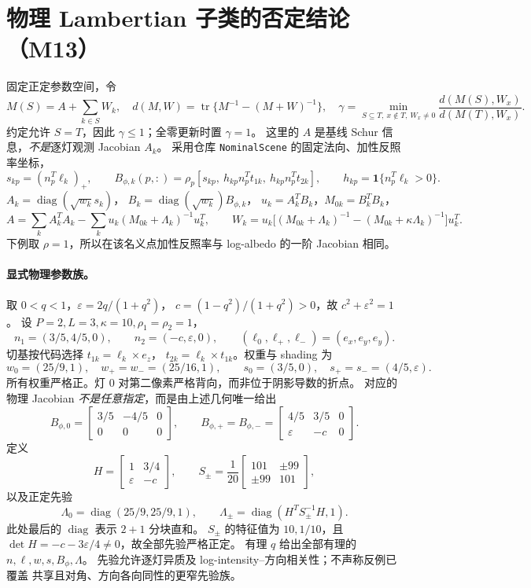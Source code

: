\section{物理 Lambertian 子类的否定结论（M13）}
\label{sec:physical-gamma-extension}

固定正定参数空间，令
\[
 M(S)=A+\sum_{k\in S}W_k,\quad
 d(M,W)=\operatorname{tr}\{M^{-1}-(M+W)^{-1}\},\quad
 \gamma=\min_{S\subseteq T,\ x\notin T,\ W_x\ne0}
 \frac{d(M(S),W_x)}{d(M(T),W_x)}.
\]
约定允许 $S=T$，因此 $\gamma\le1$；全零更新时置 $\gamma=1$。
这里的 $A$ 是基线 Schur 信息，\emph{不是}逐灯观测 Jacobian $A_k$。
采用仓库 \texttt{NominalScene} 的固定法向、加性反照率坐标，
\[
 s_{kp}=(n_p^T\ell_k)_+,
 \qquad B_{\phi,k}(p,:)=\rho_p[s_{kp},\ h_{kp}n_p^Tt_{1k},\ h_{kp}n_p^Tt_{2k}],
 \qquad h_{kp}=\mathbf1\{n_p^T\ell_k>0\}.
\]
$A_k=\operatorname{diag}(\sqrt{w_k}s_k)$，
$B_k=\operatorname{diag}(\sqrt{w_k})B_{\phi,k}$，
$u_k=A_k^TB_k$，$M_{0k}=B_k^TB_k$，
\[
 A=\sum_k A_k^TA_k-\sum_k u_k(M_{0k}+\Lambda_k)^{-1}u_k^T,
 \qquad
 W_k=u_k\big[(M_{0k}+\Lambda_k)^{-1}
 -(M_{0k}+\kappa\Lambda_k)^{-1}\big]u_k^T.
\]
下例取 $\rho=1$，所以在该名义点加性反照率与 log-albedo 的一阶 Jacobian 相同。

\paragraph{显式物理参数族。}
取 $0<q<1$，$\varepsilon=2q/(1+q^2)$，
$c=(1-q^2)/(1+q^2)>0$，故 $c^2+\varepsilon^2=1$。
设 $P=2,L=3,\kappa=10,\rho_1=\rho_2=1$，
\[
 n_1=(3/5,4/5,0),\qquad n_2=(-c,\varepsilon,0),
 \qquad (\ell_0,\ell_+,\ell_-)=(e_x,e_y,e_y).
\]
切基按代码选择 $t_{1k}=\ell_k\times e_z$，
$t_{2k}=\ell_k\times t_{1k}$。权重与 shading 为
\[
 w_0=(25/9,1),\quad w_+=w_-=(25/16,1),\qquad
 s_0=(3/5,0),\quad s_+=s_-=(4/5,\varepsilon).
\]
所有权重严格正。灯 $0$ 对第二像素严格背向，而非位于阴影导数的折点。
对应的物理 Jacobian \emph{不是任意指定}，而是由上述几何唯一给出
\[
 B_{\phi,0}=\begin{bmatrix}3/5&-4/5&0\\0&0&0\end{bmatrix},\qquad
 B_{\phi,+}=B_{\phi,-}
 =\begin{bmatrix}4/5&3/5&0\\\varepsilon&-c&0\end{bmatrix}.
\]
定义
\[
 H=\begin{bmatrix}1&3/4\\\varepsilon&-c\end{bmatrix},\qquad
 S_\pm=\frac1{20}\begin{bmatrix}101&\pm99\\\pm99&101\end{bmatrix},
\]
以及正定先验
\[
 \Lambda_0=\operatorname{diag}(25/9,25/9,1),\qquad
 \Lambda_\pm=\operatorname{diag}(H^TS_\pm^{-1}H,1).
\]
此处最后的 $\operatorname{diag}$ 表示 $2+1$ 分块直和。
$S_\pm$ 的特征值为 $10,1/10$，且
$\det H=-c-3\varepsilon/4\ne0$，故全部先验严格正定。
有理 $q$ 给出全部有理的 $n,\ell,w,s,B_\phi,\Lambda$。
先验允许逐灯异质及 log-intensity--方向相关性；不声称反例已覆盖
共享且对角、方向各向同性的更窄先验族。

